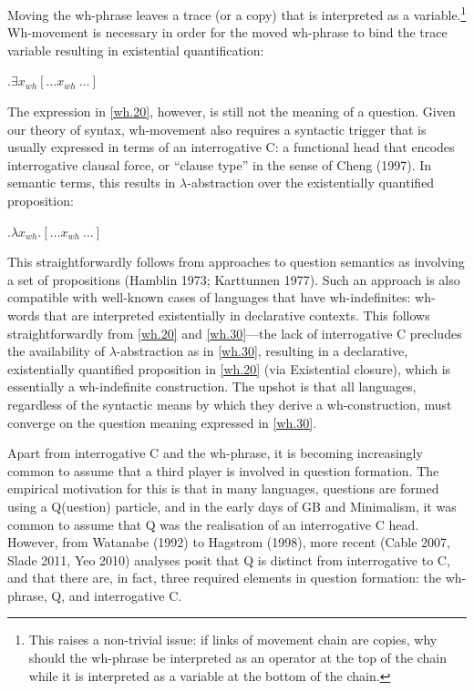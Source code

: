 \documentclass[11pt]{article}
\begin{document}
Moving the wh-phrase leaves a trace (or a copy) that is interpreted as a variable.\footnote{This raises a non-trivial issue: if links of movement chain are copies, why should the wh-phrase be interpreted as an operator at the top of the chain while it is interpreted as a variable at the bottom of the chain.} Wh-movement is necessary in order for the moved wh-phrase to bind the trace variable resulting in existential quantification:

\ex.\label{wh.20}$\exists x_{wh}[\dots x_{wh}\ \dots]$

The expression in \ref{wh.20}, however, is still not the meaning of a question. Given our theory of syntax, wh-movement also requires a syntactic trigger that is usually expressed in terms of an interrogative C: a functional head that encodes interrogative clausal force, or ``clause type'' in the sense of Cheng (1997). In semantic terms, this results in $\lambda$-abstraction over the existentially quantified proposition:

\ex.\label{wh.30}$\lambda x_{wh}. [\dots x_{wh}\ \dots]$

This straightforwardly follows from approaches to question semantics as involving a set of propositions (Hamblin 1973; Karttunnen 1977). Such an approach is also compatible with well-known cases of languages that have wh-indefinites: wh-words that are interpreted existentially in declarative contexts. This follows straightforwardly from \ref{wh.20} and \ref{wh.30}---the lack of interrogative C precludes the availability of $\lambda$-abstraction as in \ref{wh.30}, resulting in a declarative, existentially quantified proposition in \ref{wh.20} (via Existential closure), which is essentially a wh-indefinite construction. The upshot is that all languages, regardless of the syntactic means by which they derive a wh-construction, must converge on the question meaning expressed in \ref{wh.30}.

Apart from interrogative C and the wh-phrase, it is becoming increasingly common to assume that a third player is involved in question formation. The empirical motivation for this is that in many languages, questions are formed using a Q(uestion) particle, and in the early days of GB and Minimalism, it was common to assume that Q was the realisation of an interrogative C head. However, from Watanabe (1992) to Hagstrom (1998), more recent (Cable 2007, Slade 2011, Yeo 2010) analyses posit that Q is distinct from interrogative to C, and that there are, in fact, three required elements in question formation: the wh-phrase, Q, and interrogative C.
\end{document}
